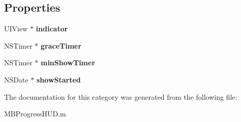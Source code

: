 \subsection*{Properties}
\begin{DoxyCompactItemize}
\item 
\hypertarget{category_m_b_progress_h_u_d_07_08_a88f0841ae8c0e93249afc68954859072}{U\+I\+View $\ast$ {\bfseries indicator}}\label{category_m_b_progress_h_u_d_07_08_a88f0841ae8c0e93249afc68954859072}

\item 
\hypertarget{category_m_b_progress_h_u_d_07_08_a856da5d6ea8f970c9f79cd43f8f4e3d7}{N\+S\+Timer $\ast$ {\bfseries grace\+Timer}}\label{category_m_b_progress_h_u_d_07_08_a856da5d6ea8f970c9f79cd43f8f4e3d7}

\item 
\hypertarget{category_m_b_progress_h_u_d_07_08_ae0ef7ca861bf900eaed11b57ad49eddc}{N\+S\+Timer $\ast$ {\bfseries min\+Show\+Timer}}\label{category_m_b_progress_h_u_d_07_08_ae0ef7ca861bf900eaed11b57ad49eddc}

\item 
\hypertarget{category_m_b_progress_h_u_d_07_08_a45366644943d7cd700062c755ceef991}{N\+S\+Date $\ast$ {\bfseries show\+Started}}\label{category_m_b_progress_h_u_d_07_08_a45366644943d7cd700062c755ceef991}

\end{DoxyCompactItemize}


The documentation for this category was generated from the following file\+:\begin{DoxyCompactItemize}
\item 
M\+B\+Progress\+H\+U\+D.\+m\end{DoxyCompactItemize}
